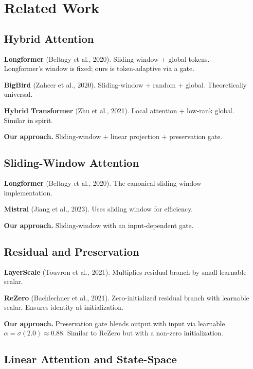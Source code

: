 
\section{Related Work}

\subsection{Hybrid Attention}

\textbf{Longformer} (Beltagy et al., 2020). Sliding-window + global tokens. 
Longformer's window is fixed; ours is token-adaptive via a gate.

\textbf{BigBird} (Zaheer et al., 2020). Sliding-window + random + global. 
Theoretically universal.

\textbf{Hybrid Transformer} (Zhu et al., 2021). Local attention + low-rank 
global. Similar in spirit.

\textbf{Our approach.} Sliding-window + linear projection + preservation gate.

\subsection{Sliding-Window Attention}

\textbf{Longformer} (Beltagy et al., 2020). The canonical sliding-window 
implementation.

\textbf{Mistral} (Jiang et al., 2023). Uses sliding window for efficiency.

\textbf{Our approach.} Sliding-window with an input-dependent gate.

\subsection{Residual and Preservation}

\textbf{LayerScale} (Touvron et al., 2021). Multiplies residual branch by small 
learnable scalar.

\textbf{ReZero} (Bachlechner et al., 2021). Zero-initialized residual branch 
with learnable scalar. Ensures identity at initialization.

\textbf{Our approach.} Preservation gate blends output with input via learnable 
$\alpha = \sigma(2.0) \approx 0.88$. Similar to ReZero but with a 
non-zero initialization.

\subsection{Linear Attention and State-Space}

